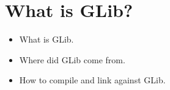 \chapter{What is GLib?}

\begin{itemize}
\item What is GLib.
\item Where did GLib come from.
\item How to compile and link against GLib.
\end{itemize}
